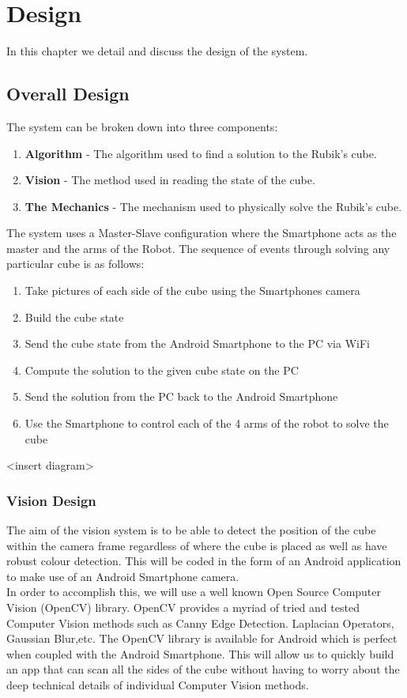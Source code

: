 \documentclass[titlepage]{report}[12pt]
\begin{document}
\chapter{Design}
In this chapter we detail and discuss the design of the system.
\section{Overall Design}
The system can be broken down into three components: 
\begin{enumerate}
\item \textbf{Algorithm} - The algorithm used to find a solution to the Rubik's cube.
\item \textbf{Vision} - The method used in reading the state of the cube.
\item \textbf{The Mechanics} - The mechanism used to physically solve the Rubik's cube.
\end{enumerate}

The system uses a Master-Slave configuration where the Smartphone acts as the master and the arms of the Robot. The sequence of events through solving any particular cube is as follows:
\begin{enumerate}
\item Take pictures of each side of the cube using the Smartphones camera
\item Build the cube state
\item Send the cube state from the Android Smartphone to the PC via WiFi 
\item Compute the solution to the given cube state on the PC
\item Send the solution from the PC back to the Android Smartphone
\item Use the Smartphone to control each of the 4 arms of the robot to solve the cube
\end{enumerate}

<insert diagram>

\subsection{Vision Design}
The aim of the vision system is to be able to detect the position of the cube within the camera frame regardless of where the cube is placed as well as have robust colour detection. This will be coded in the form of an Android application to make use of an Android Smartphone camera.
\\ \indent 
In order to accomplish this, we will use a well known Open Source Computer Vision (OpenCV) library. OpenCV provides a myriad of tried and tested Computer Vision methods such as Canny Edge Detection. Laplacian Operators, Gaussian Blur,etc. The OpenCV library is available for Android which is perfect when coupled with the Android Smartphone. This will allow us to quickly build an app that can scan all the sides of the cube without having to worry about the deep technical details of individual Computer Vision methods. 
\end{document}
